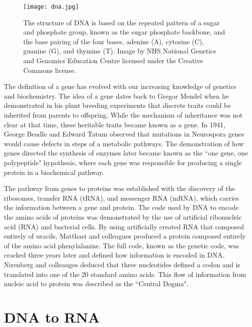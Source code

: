 \begin{figure}[!ht]
   \centering
   \texttt{[image: dna.jpg]}
   \caption[The structure of DNA]{The structure of DNA is based on the repeated pattern of a sugar and phosphate group, known as the sugar phosphate backbone, and the base pairing of the four bases, adenine (A), cytosine (C), guanine (G), and thymine (T). Image by NHS National Genetics and Genomics Education Centre licensed under the Creative Commons license.}
   \label{fig:dna}
\end{figure}

The definition of a gene has evolved with our increasing knowledge of genetics and biochemistry\cite{pmid17567988}. The idea of a gene dates back to Gregor Mendel when he demonstrated in his plant breeding experiments that discrete traits could be inherited from parents to offspring. While the mechanism of inheritance was not clear at that time, these heritable traits became known as a gene. In 1941, George Beadle and Edward Tatum observed that mutations in Neurospora genes would cause defects in steps of a metabolic pathways\cite{Beadle15111941}. The demonstration of how genes directed the synthesis of enzymes later became known as the ``one gene, one polypeptide" hypothesis, where each gene was responsible for producing a single protein in a biochemical pathway.

The pathway from genes to proteins was established with the discovery of the ribosomes\cite{pmid14381428}, transfer RNA (tRNA)\cite{pmid13538965}, and messenger RNA (mRNA)\cite{BRENNER1961}, which carries the information between a gene and protein. The code used by DNA to encode the amino acids of proteins was demonstrated by the use of artificial ribonucleic acid (RNA) and bacterial cells\cite{pmid14471390}. By using artificially created RNA that composed entirely of uracils, Matthaei and colleagues produced a protein composed entirely of the amino acid phenylalanine. The full code, known as the genetic code, was cracked three years later\cite{pmid5330357} and defined how information is encoded in DNA. Nirenberg and colleauges deduced that three nucleotides defined a codon and is translated into one of the 20 standard amino acids. This flow of information from nucleic acid to protein was described as the ``Central Dogma"\cite{crick1958protein}.

\section{DNA to RNA}

